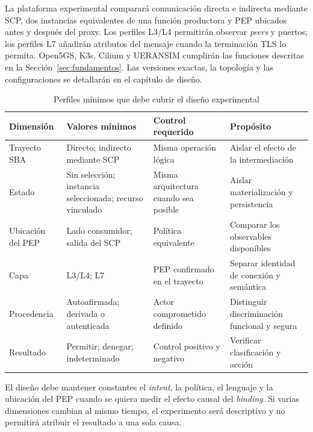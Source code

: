 La plataforma experimental comparará comunicación directa e indirecta mediante SCP, dos instancias equivalentes de una función productora y PEP ubicados antes y después del proxy. Los perfiles L3/L4 permitirán observar \textit{peers} y puertos; los perfiles L7 añadirán atributos del mensaje cuando la terminación TLS lo permita. Open5GS, K3s, Cilium y UERANSIM cumplirán las funciones descritas en la Sección~\ref{sec:fundamentos}. Las versiones exactas, la topología y las configuraciones se detallarán en el capítulo de diseño.

\begin{table}[H]
    \centering
    \caption{Perfiles mínimos que debe cubrir el diseño experimental}
    \label{tab:perfiles-minimos}
    \small
    \begin{singlespace}
    \begin{tabularx}{\textwidth}{@{}
        >{\raggedright\arraybackslash}p{2.45cm}
        >{\raggedright\arraybackslash}p{2.6cm}
        >{\raggedright\arraybackslash}p{2.4cm}
        >{\raggedright\arraybackslash}X@{}}
        \toprule
        Dimensión & Valores mínimos & Control requerido & Propósito \\
        \midrule
        Trayecto SBA & Directo; indirecto mediante SCP & Misma operación lógica & Aislar el efecto de la intermediación \\
        Estado & Sin selección; instancia seleccionada; recurso vinculado & Misma arquitectura cuando sea posible & Aislar materialización y persistencia \\
        Ubicación del PEP & Lado consumidor; salida del SCP & Política equivalente & Comparar los observables disponibles \\
        Capa & L3/L4; L7 & PEP confirmado en el trayecto & Separar identidad de conexión y semántica \\
        Procedencia & Autoafirmada; derivada o autenticada & Actor comprometido definido & Distinguir discriminación funcional y segura \\
        Resultado & Permitir; denegar; indeterminado & Control positivo y negativo & Verificar clasificación y acción \\
        \bottomrule
    \end{tabularx}
    \end{singlespace}
\end{table}

El diseño debe mantener constantes el \textit{intent}, la política, el lenguaje y la ubicación del PEP cuando se quiera medir el efecto causal del \textit{binding}. Si varias dimensiones cambian al mismo tiempo, el experimento será descriptivo y no permitirá atribuir el resultado a una sola causa.

